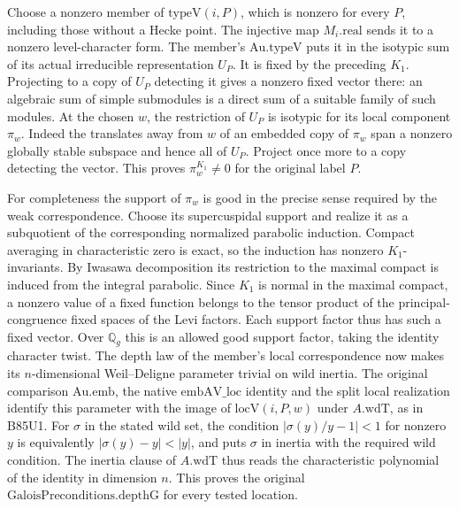 Choose a nonzero member of $\mathrm{typeV}(i,P)$, which is nonzero
for every $P$, including those without a Hecke point. The injective
map $M_i.\mathrm{real}$ sends it to a nonzero level-character form.
The member's $\mathrm{Au}.\mathrm{typeV}$ puts it in the isotypic
sum of its actual irreducible representation $U_P$. It is fixed by
the preceding $K_1$. Projecting to a copy of $U_P$ detecting it
gives a nonzero fixed vector there: an algebraic sum of simple
submodules is a direct sum of a suitable family of such modules.
At the chosen $w$, the restriction of $U_P$ is isotypic for its
local component $\pi_w$. Indeed the translates away from $w$ of an
embedded copy of $\pi_w$ span a nonzero globally stable subspace
and hence all of $U_P$. Project once more to a copy detecting the
vector. This proves $\pi_w^{K_1}\ne0$ for the original label $P$.

For completeness the support of $\pi_w$ is good in the precise
sense required by the weak correspondence. Choose its supercuspidal
support and realize it as a subquotient of the corresponding
normalized parabolic induction. Compact averaging in characteristic
zero is exact, so the induction has nonzero $K_1$-invariants.
By Iwasawa decomposition its restriction to the maximal compact
is induced from the integral parabolic. Since $K_1$ is normal
in the maximal compact, a nonzero value of a fixed function
belongs to the tensor product of the principal-congruence fixed
spaces of the Levi factors. Each support factor thus has such a
fixed vector. Over $\mathbb Q_g$ this is an allowed good support
factor, taking the identity character twist.
The depth law of the member's local correspondence now makes its
$n$-dimensional Weil--Deligne parameter trivial on wild inertia.
The original comparison $\mathrm{Au}.\mathrm{emb}$, the native
$\mathrm{embAV\_loc}$ identity and the split local realization
identify this parameter with the image of $\mathrm{locV}(i,P,w)$
under $A.\mathrm{wdT}$, as in B85U1. For $\sigma$ in the stated
wild set, the condition $|\sigma(y)/y-1|<1$ for nonzero $y$ is
equivalently $|\sigma(y)-y|<|y|$, and puts $\sigma$ in inertia
with the required wild condition. The inertia clause of
$A.\mathrm{wdT}$ thus reads the characteristic polynomial of the
identity in dimension $n$. This proves the original
$\mathrm{GaloisPreconditions.depthG}$ for every tested location.
